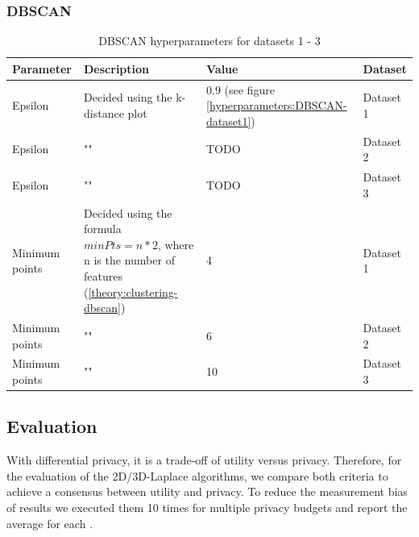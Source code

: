 \subsubsection{DBSCAN}
\begin{table}[h]
  \begin{tabular}{|l|p{6cm}|l|l|}
    \hline
    Parameter      & Description                                                                                                    & Value                                                  & Dataset   \\
    \hline
    Epsilon        & Decided using the k-distance plot                                                                              & 0.9 (see figure \ref{hyperparameters:DBSCAN-dataset1}) & Dataset 1 \\
    \hline
    Epsilon        & ""                                                                                                             & TODO                                                   & Dataset 2 \\
    \hline
    Epsilon        & ""                                                                                                             & TODO                                                   & Dataset 3 \\
    \hline
    Minimum points & Decided using the formula $minPts = n * 2$, where n is the number of features (\ref{theory:clustering-dbscan}) & 4                                                      & Dataset 1 \\
    \hline
    Minimum points & ""                                                                                                             & 6                                                      & Dataset 2 \\
    \hline
    Minimum points & ""                                                                                                             & 10                                                     & Dataset 3 \\
    \hline
  \end{tabular}
  \caption{DBSCAN  hyperparameters for datasets 1 - 3}
  \label{tab:dbscan-formula-sklearn}
\end{table}

\subsection{Evaluation}
With differential privacy, it is a trade-off of utility versus privacy.
Therefore, for the evaluation of the 2D/3D-Laplace algorithms, we compare both criteria to achieve a consensus between utility and privacy.
To reduce the measurement bias of results we executed them 10 times for multiple privacy budgets and report the average for each \citep{9679364}.

